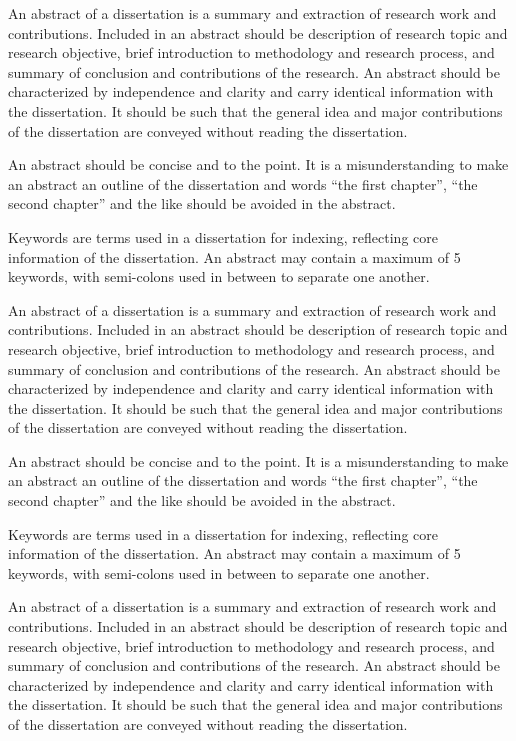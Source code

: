 
An abstract of a dissertation is a summary and extraction of research work and contributions. Included in an abstract should be description of research topic and research objective, brief introduction to methodology and research process, and summary of conclusion and contributions of the research. An abstract should be characterized by independence and clarity and carry identical information with the dissertation. It should be such that the general idea and major contributions of the dissertation are conveyed without reading the dissertation.

An abstract should be concise and to the point. It is a misunderstanding to make an abstract an outline of the dissertation and words ``the first chapter'', ``the second chapter'' and the like should be avoided in the abstract.

Keywords are terms used in a dissertation for indexing, reflecting core information of the dissertation. An abstract may contain a maximum of 5 keywords, with semi-colons used in between to separate one another.

An abstract of a dissertation is a summary and extraction of research work and contributions. Included in an abstract should be description of research topic and research objective, brief introduction to methodology and research process, and summary of conclusion and contributions of the research. An abstract should be characterized by independence and clarity and carry identical information with the dissertation. It should be such that the general idea and major contributions of the dissertation are conveyed without reading the dissertation.

An abstract should be concise and to the point. It is a misunderstanding to make an abstract an outline of the dissertation and words ``the first chapter'', ``the second chapter'' and the like should be avoided in the abstract.

Keywords are terms used in a dissertation for indexing, reflecting core information of the dissertation. An abstract may contain a maximum of 5 keywords, with semi-colons used in between to separate one another.

An abstract of a dissertation is a summary and extraction of research work and contributions. Included in an abstract should be description of research topic and research objective, brief introduction to methodology and research process, and summary of conclusion and contributions of the research. An abstract should be characterized by independence and clarity and carry identical information with the dissertation. It should be such that the general idea and major contributions of the dissertation are conveyed without reading the dissertation.

